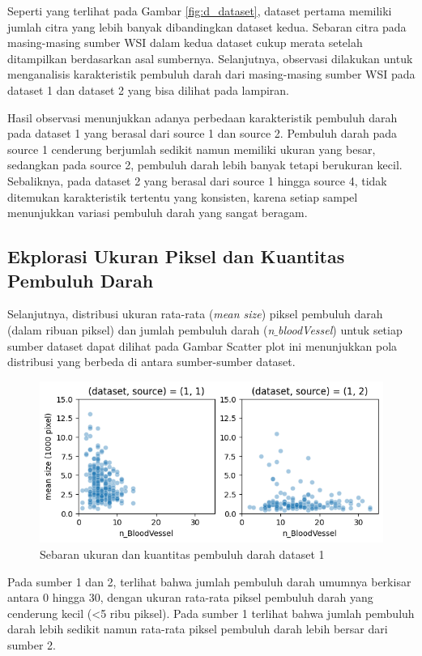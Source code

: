 \noindent Seperti yang terlihat pada Gambar \ref{fig:d_dataset}, dataset pertama memiliki jumlah citra yang lebih banyak dibandingkan dataset kedua. Sebaran citra pada masing-masing sumber WSI dalam kedua dataset cukup merata setelah ditampilkan berdasarkan asal sumbernya. Selanjutnya, observasi dilakukan untuk menganalisis karakteristik pembuluh darah dari masing-masing sumber WSI pada dataset 1 dan dataset 2 yang bisa dilihat pada lampiran.


\noindent Hasil observasi menunjukkan adanya perbedaan karakteristik pembuluh darah pada dataset 1 yang berasal dari source 1 dan source 2. Pembuluh darah pada source 1 cenderung berjumlah sedikit namun memiliki ukuran yang besar, sedangkan pada source 2, pembuluh darah lebih banyak tetapi berukuran kecil. Sebaliknya, pada dataset 2 yang berasal dari source 1 hingga source 4, tidak ditemukan karakteristik tertentu yang konsisten, karena setiap sampel menunjukkan variasi pembuluh darah yang sangat beragam.

\subsection{Ekplorasi Ukuran Piksel dan Kuantitas Pembuluh Darah}

\noindent Selanjutnya, distribusi ukuran rata-rata (\textit{mean size}) piksel pembuluh darah (dalam ribuan piksel) dan jumlah pembuluh darah (\textit{n$\_$bloodVessel}) untuk setiap sumber dataset dapat dilihat pada Gambar  Scatter plot ini menunjukkan pola distribusi yang berbeda di antara sumber-sumber dataset.

\begin{figure}[H]
	\centering
	\includegraphics[width=\textwidth]{gambar/bab4/sct_1.png}
	\caption{Sebaran ukuran dan kuantitas pembuluh darah dataset 1}
	\label{fig:sct_1}
\end{figure}

\noindent Pada sumber 1 dan 2, terlihat bahwa jumlah pembuluh darah umumnya berkisar antara 0 hingga 30, dengan ukuran rata-rata piksel pembuluh darah yang cenderung kecil (<5 ribu piksel). Pada sumber 1 terlihat bahwa jumlah pembuluh darah lebih sedikit namun rata-rata piksel pembuluh darah lebih bersar dari sumber 2.

